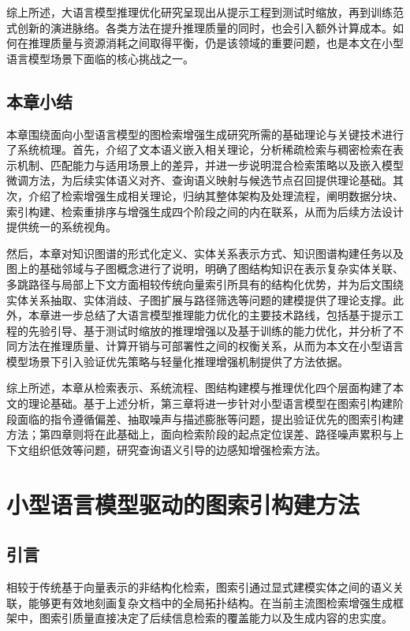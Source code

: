 \documentclass[promaster, vlined]{DissertUESTC}
\begin{document}
综上所述，大语言模型推理优化研究呈现出从提示工程到测试时缩放，再到训练范式创新的演进脉络。各类方法在提升推理质量的同时，也会引入额外计算成本。如何在推理质量与资源消耗之间取得平衡，仍是该领域的重要问题，也是本文在小型语言模型场景下面临的核心挑战之一。


\section{本章小结}

本章围绕面向小型语言模型的图检索增强生成研究所需的基础理论与关键技术进行了系统梳理。首先，介绍了文本语义嵌入相关理论，分析稀疏检索与稠密检索在表示机制、匹配能力与适用场景上的差异，并进一步说明混合检索策略以及嵌入模型微调方法，为后续实体语义对齐、查询语义映射与候选节点召回提供理论基础。其次，介绍了检索增强生成相关理论，归纳其整体架构及处理流程，阐明数据分块、索引构建、检索重排序与增强生成四个阶段之间的内在联系，从而为后续方法设计提供统一的系统视角。

然后，本章对知识图谱的形式化定义、实体关系表示方式、知识图谱构建任务以及图上的基础邻域与子图概念进行了说明，明确了图结构知识在表示复杂实体关联、多跳路径与局部上下文方面相较传统向量索引所具有的结构化优势，并为后文围绕实体关系抽取、实体消歧、子图扩展与路径筛选等问题的建模提供了理论支撑。此外，本章进一步总结了大语言模型推理能力优化的主要技术路线，包括基于提示工程的先验引导、基于测试时缩放的推理增强以及基于训练的能力优化，并分析了不同方法在推理质量、计算开销与可部署性之间的权衡关系，从而为本文在小型语言模型场景下引入验证优先策略与轻量化推理增强机制提供了方法依据。

综上所述，本章从检索表示、系统流程、图结构建模与推理优化四个层面构建了本文的理论基础。基于上述分析，第三章将进一步针对小型语言模型在图索引构建阶段面临的指令遵循偏差、抽取噪声与描述膨胀等问题，提出验证优先的图索引构建方法；第四章则将在此基础上，面向检索阶段的起点定位误差、路径噪声累积与上下文组织低效等问题，研究查询语义引导的边感知增强检索方法。


\chapter{小型语言模型驱动的图索引构建方法}
\section{引言}
相较于传统基于向量表示的非结构化检索，图索引通过显式建模实体之间的语义关联，能够更有效地刻画复杂文档中的全局拓扑结构。在当前主流图检索增强生成框架中，图索引质量直接决定了后续信息检索的覆盖能力以及生成内容的忠实度。
\end{document}
